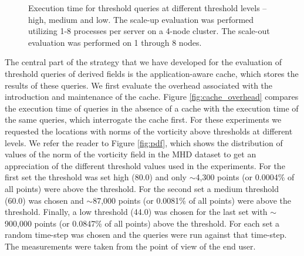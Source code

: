 \documentclass{sig-alternate}
\begin{document}
\begin{figure}
\centering
{}
\caption{Execution time for threshold queries at different threshold levels -- high, medium and low. The scale-up evaluation was performed 
utilizing 1-8 processes per server on a 4-node cluster. The scale-out evaluation was performed on 1 through 8 nodes.}
\label{fig:scaling}
\end{figure}

The central part of the strategy that we have developed for the evaluation of threshold queries of derived fields is the application-aware cache, which
stores the results of these queries. We first evaluate the overhead associated with the introduction and maintenance of the cache. Figure
\ref{fig:cache_overhead} compares the execution time of queries in the absence of a cache with the execution time of the same queries, which interrogate
the cache first. For these experiments we requested
the locations with norms of the vorticity above thresholds at different levels. We refer the reader to Figure \ref{fig:pdf}, which shows the distribution of values of
the norm of the vorticity field in the MHD dataset to get an appreciation of the different threshold values used in the experiments. 
For the first set the threshold was set high (80.0) and only $\sim$4,300 points 
(or 0.0004\% of all points) were above the threshold. For the second set a medium threshold (60.0) was chosen and $\sim$87,000 points 
(or 0.0081\% of all points) were above the threshold. Finally, a low threshold (44.0) was chosen for the last set with $\sim$900,000 points 
(or 0.0847\% of all points) above the threshold. For each set a random
time-step was chosen and the queries were run against that time-step. The measurements were taken from the point of view of the end user. 
\end{document}
